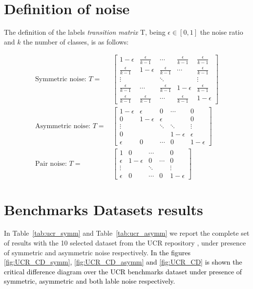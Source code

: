 \documentclass{llncs}
\newcommand{\new}[1]{\textcolor{black}{#1}}
\begin{document}
\clearpage
\section{Definition of noise}\label{app:T}
The definition of the labels \textit{transition matrix} T, being $\epsilon \in [0, 1]$ the noise ratio and $k$ the number of classes, is as follows:

\begin{align*}
    \text{Symmetric noise: } T= & \,
    \begin{bmatrix}
        1 - \epsilon & \frac{\epsilon}{k -1} & \cdots & \frac{\epsilon}{k -1} & \frac{\epsilon}{k -1} \\
        \frac{\epsilon}{k -1} & 1-\epsilon & \frac{\epsilon}{k -1} & \cdots & \frac{\epsilon}{k -1}\\
        \vdots & & \ddots & & \vdots\\
        \frac{\epsilon}{k -1} & \cdots & \frac{\epsilon}{k -1} & 1-\epsilon & \frac{\epsilon}{k -1}\\
        \frac{\epsilon}{k -1} & \frac{\epsilon}{k -1} & \cdots & \frac{\epsilon}{k -1} & 1 - \epsilon
    \end{bmatrix}\\
    \text{Asymmetric noise: } T= &\,
    \begin{bmatrix}
        1-\epsilon & \epsilon & 0 & \cdots & 0 \\
        0 & 1-\epsilon & \epsilon & & 0\\
        \vdots & & \ddots & \ddots & \vdots\\
        0 & & & 1-\epsilon & \epsilon\\
        \epsilon & 0 & \cdots & 0 & 1-\epsilon
    \end{bmatrix}\\
    \text{Pair noise: } T = & \,
    \begin{bmatrix}
        1 & 0 & \cdots & & 0 \\
        \epsilon & 1-\epsilon & 0 & \cdots & 0 \\
        \vdots & & \ddots & & \vdots \\
        \epsilon & 0 & \cdots & 0 & 1-\epsilon
    \end{bmatrix}
\end{align*}
    


\section{Benchmarks Datasets results}
In Table~\ref{tab:ucr_symm} and Table~\ref{tab:ucr_asymm} we report the complete set of results with the 10 selected dataset from the UCR repository \cite{UCRArchive2018}, under presence of symmetric and asymmetric noise respectively.
\new{In the figures \ref{fig:UCR_CD_symm}, \ref{fig:UCR_CD_asymm} and \ref{fig:UCR_CD} is shown the critical difference diagram over the UCR benchmarks dataset under presence of symmetric, asymmetric and both lable noise respectively.}
\end{document}
